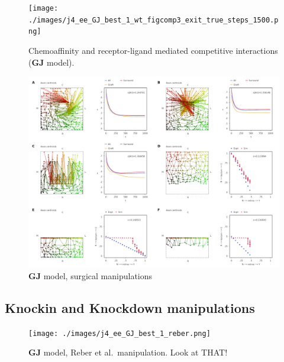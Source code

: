 \documentclass[11pt, a4paper]{article}
\begin{document}
\begin{figure}
\texttt{[image: ./images/j4\_ee\_GJ\_best\_1\_wt\_figcomp3\_exit\_true\_steps\_1500.png]}
\caption{Chemoaffinity and receptor-ligand mediated competitive interactions
($\mathbf{GJ}$ model). }
\label{f:GJ}
\end{figure}

\begin{figure}
\includegraphics[width=\linewidth]{./images/fig_GJ_surgical.png}
\caption{$\mathbf{GJ}$ model, surgical manipulations}
\label{f:GJsurg}
\end{figure}

\subsection*{Knockin and Knockdown manipulations}



\begin{figure}
\texttt{[image: ./images/j4\_ee\_GJ\_best\_1\_reber.png]}
\caption{$\mathbf{GJ}$ model, Reber et al.~manipulation. Look at THAT!}
\label{f:GJreber}
\end{figure}


\end{document}
